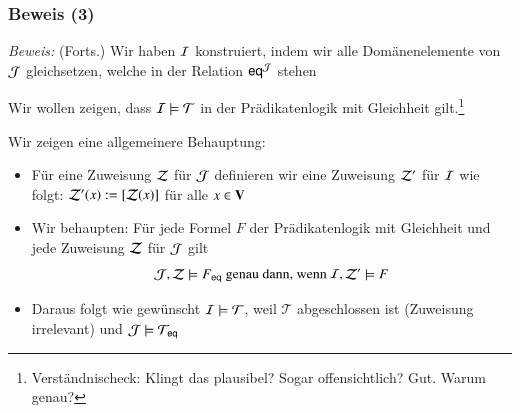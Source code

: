 \documentclass[aspectratio=1610,onlymath]{beamer}
\begin{document}
\begin{frame}[t]\frametitle{Beweis (3)}

% 

\emph{Beweis:} {\footnotesize(Forts.)}
Wir haben $\mathcal{I}$ konstruiert, indem wir alle Domänenelemente von $\mathcal{J}$
gleichsetzen, welche in der Relation $\textsf{eq}^{\mathcal{J}}$ stehen
\medskip

Wir wollen zeigen, dass $\mathcal{I}\models\mathcal{T}$ in der Prädikatenlogik mit Gleichheit gilt.\footnote{\tiny Verständnischeck: Klingt das plausibel? Sogar offensichtlich? Gut. Warum genau?}\pause\medskip

\alert{Wir zeigen eine allgemeinere Behauptung:}
\begin{itemize}
\item Für eine Zuweisung $\mathcal{Z}$ für $\mathcal{J}$ definieren wir eine Zuweisung $\mathcal{Z}'$ für $\mathcal{I}$ wie folgt: $\mathcal{Z}'(x)\mathrel{:=}[\mathcal{Z}(x)]$ für alle $x\in\textbf{\textcolor{black}{V}}$
\item Wir behaupten: Für jede Formel $F$ der Prädikatenlogik mit Gleichheit und jede Zuweisung $\mathcal{Z}$ für $\mathcal{J}$ gilt
\[ \mathcal{J},\mathcal{Z}\models F_{\textsf{eq}} \text{ genau dann, wenn } \mathcal{I},\mathcal{Z}'\models F \]
\item Daraus folgt wie gewünscht $\mathcal{I}\models\mathcal{T}$, weil $\mathcal{T}$ abgeschlossen ist (Zuweisung irrelevant) und $\mathcal{J}\models\mathcal{T}_{\textsf{eq}}$
% 
\end{itemize}


\end{frame}
\end{document}
